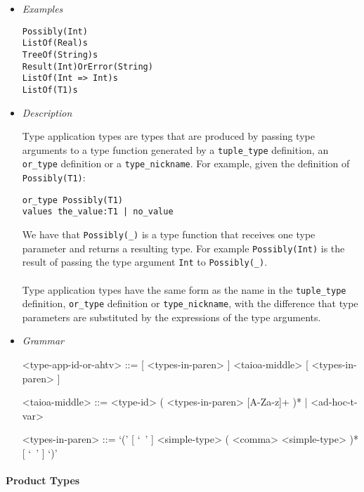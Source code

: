 \documentclass{article}
\begin{document}
\begin{itemize}
\item \textit{Examples}
\begin{verbatim}
Possibly(Int)
ListOf(Real)s
TreeOf(String)s
Result(Int)OrError(String)
ListOf(Int => Int)s
ListOf(T1)s
\end{verbatim}

\item \textit{Description}

Type application types are types that are produced by passing type arguments to
a type function generated by a \verb|tuple_type| definition, an \verb|or_type|
definition or a \verb|type_nickname|. For example, given the definition of
\verb|Possibly(T1)|:
\begin{verbatim}
or_type Possibly(T1)
values the_value:T1 | no_value
\end{verbatim}
We have that \verb|Possibly(_)| is a type function that receives one type
parameter and returns a resulting type. For example \verb|Possibly(Int)| is
the result of passing the type argument \verb|Int| to \verb|Possibly(_)|.
\\\\
Type application types have the same form as the name in the \verb|tuple_type|
definition, \verb|or_type| definition or \verb|type_nickname|, with the
difference that type parameters are substituted by the expressions of the type
arguments.

\item \textit{Grammar}
\begin{grammar}
<type-app-id-or-ahtv> ::=
[ <types-in-paren> ] <taioa-middle> [ <types-in-paren> ]

<taioa-middle> ::=
<type-id> ( <types-in-paren> [A-Za-z]+ )* | <ad-hoc-t-var>

<types-in-paren> ::=
`(' [ `\ ' ] <simple-type> ( <comma> <simple-type> )* [ `\ ' ] `)'
\end{grammar}
\end{itemize}

\newpage

\paragraph{Product Types}
\end{document}

